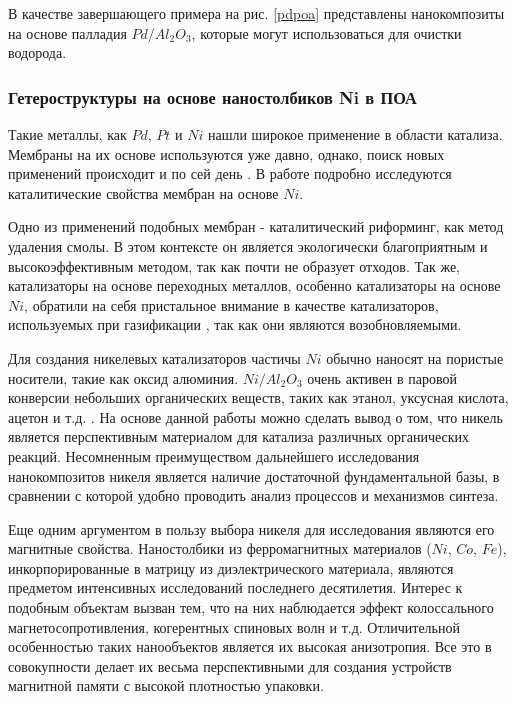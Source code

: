 В качестве завершающего примера на рис. \ref{pdpoa} представлены нанокомпозиты на основе палладия $Pd/Al_2O_3$, которые могут использоваться для очистки водорода.


\subsubsection{Гетероструктуры на основе наностолбиков Ni в ПОА}

Такие металлы, как $Pd$, $Pt$ и $Ni$ нашли широкое применение в области катализа. Мембраны на их основе используются уже давно, однако, поиск новых применений происходит и по сей день \cite{guaiacol}. В работе \cite{buhtiyarov} подробно исследуются каталитические свойства мембран на основе $Ni$.

Одно из применений подобных мембран - каталитический риформинг, как метод удаления смолы. В этом контексте он является экологически благоприятным и высокоэффективным методом, так как почти не образует отходов. Так же, катализаторы на основе переходных металлов, особенно катализаторы на основе $Ni$, обратили на себя пристальное внимание в качестве катализаторов, используемых при газификации \cite{buhtiyarov}, \cite{guaiacol} так как они являются возобновляемыми.

Для создания никелевых катализаторов частичы $Ni$ обычно наносят на пористые носители, такие как оксид алюминия. $Ni/Al_2O_3$ очень активен в паровой конверсии небольших органических веществ, таких как этанол, уксусная кислота, ацетон и т.д. \cite{buhtiyarov}. На основе данной работы можно сделать вывод о том, что никель является перспективным материалом для катализа различных органических реакций. Несомненным преимуществом дальнейшего исследования нанокомпозитов никеля является наличие достаточной фундаментальной базы, в сравнении с которой удобно проводить анализ процессов и механизмов синтеза.

Еще одним аргументом в пользу выбора никеля для исследования являются его магнитные свойства. Наностолбики из ферромагнитных материалов ($Ni$, $Co$, $Fe$), инкорпорированные в матрицу из диэлектрического материала, являются предметом интенсивных исследований последнего десятилетия. Интерес к подобным объектам вызван тем, что на них наблюдается эффект колоссального магнетосопротивления, когерентных спиновых волн и т.д. Отличительной особенностью таких нанообъектов является их высокая анизотропия. Все это в совокупности делает их весьма перспективными для создания устройств магнитной памяти с высокой плотностью упаковки\cite{ziganshina}.


